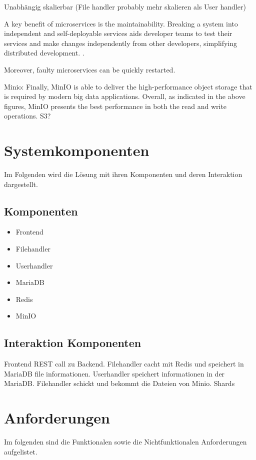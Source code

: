 \documentclass[12pt]{report}
\begin{document}
			Unabhängig skalierbar (File handler probably mehr skalieren als User handler)
			
			A key benefit of microservices is the maintainability. Breaking a system into independent and self-deployable services aids developer teams to test their services and make changes independently from other developers, simplifying distributed development. \cite{de2019monolithic}.
			
			Moreover, faulty microservices can be quickly restarted.  \cite{taibi2017processes}
			
			Minio:
			Finally, MinIO is able to deliver the high-performance object storage that is required by modern big data applications. \cite{makris2022performance}
			Overall, as indicated in the above figures, MinIO presents the best performance in both the read and write operations. \cite{makris2022performance}
			S3?
			
	\section{Systemkomponenten}
		Im Folgenden wird die Lösung mit ihren Komponenten und deren Interaktion dargestellt.
		\subsection{Komponenten}
			\begin{itemize}
				\item Frontend
				\item Filehandler
				\item Userhandler
				\item MariaDB
				\item Redis
				\item MinIO
			\end{itemize}
		\subsection{Interaktion Komponenten}
			Frontend REST call zu Backend.
			Filehandler cacht mit Redis und speichert in MariaDB file informationen.
			Userhandler speichert informationen in der MariaDB.
			Filehandler schickt und bekommt die Dateien von Minio. Shards
		
	\section{Anforderungen}
		Im folgenden sind die Funktionalen sowie die Nichtfunktionalen Anforderungen aufgelistet.
\end{document}
